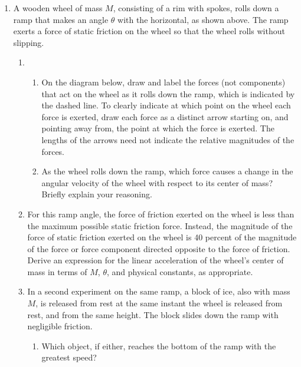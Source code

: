 \documentclass{../../../oss-apphys}
\begin{document}
\begin{enumerate}[leftmargin=15pt]
\item A wooden wheel of mass $M$, consisting of a rim with spokes, rolls down
  a ramp that makes an angle $\theta$ with the horizontal, as shown above. The
  ramp exerts a force of static friction on the wheel so that the wheel rolls
  without slipping.
  \begin{enumerate}[leftmargin=15pt,noitemsep]
  \item
    \begin{enumerate}[leftmargin=15pt,noitemsep]
    \item On the diagram below, draw and label the forces (not components) that
      act on the wheel as it rolls down the ramp, which is indicated by the
      dashed line. To clearly indicate at which point on the wheel each force
      is exerted, draw each force as a distinct arrow starting on, and pointing
      away from, the point at which the force is exerted. The lengths of the
      arrows need not indicate the relative magnitudes of the forces.
      \begin{center}
      \end{center}
    \item As the wheel rolls down the ramp, which force causes a change in the
      angular velocity of the wheel with respect to its center of mass? Briefly
      explain your reasoning.
      \vspace{.7in}
    \end{enumerate}

  \item For this ramp angle, the force of friction exerted on the wheel is less
    than the maximum possible static friction force. Instead, the magnitude of
    the force of static friction exerted on the wheel is 40 percent of the
    magnitude of the force or force component directed opposite to the force of
    friction. Derive an expression for the linear acceleration of the wheel's
    center of mass in terms of $M$, $\theta$, and physical constants, as
    appropriate.
    \newpage
    
  \item In a second experiment on the same ramp, a block of ice, also with mass
    $M$, is released from rest at the same instant the wheel is released from
    rest, and from the same height. The block slides down the ramp with
    negligible friction.
    \begin{enumerate}[leftmargin=15pt,noitemsep]
    \item Which object, if either, reaches the bottom of the ramp with the
      greatest speed?


\end{enumerate}
\end{enumerate}
\end{enumerate}
\end{document}
